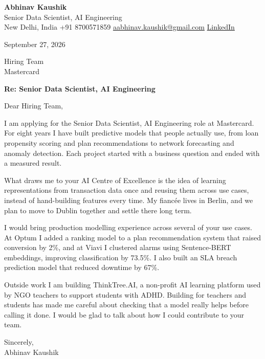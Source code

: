 \documentclass[11pt,a4paper]{article}
\begin{document}
{\Large\bfseries Abhinav Kaushik}\\
Senior Data Scientist, AI Engineering\\
New Delhi, India \textbar{} +91 8700571859 \textbar{} \href{mailto:aabhinav.kaushik@gmail.com}{aabhinav.kaushik@gmail.com} \textbar{} \href{https://www.linkedin.com/in/abhinav-kaushik10/}{LinkedIn}  

September 27, 2026

Hiring Team\\
Mastercard

\textbf{Re: Senior Data Scientist, AI Engineering}

Dear Hiring Team,

I am applying for the Senior Data Scientist, AI Engineering role at Mastercard. For eight years I have built predictive models that people actually use, from loan propensity scoring and plan recommendations to network forecasting and anomaly detection. Each project started with a business question and ended with a measured result.

What draws me to your AI Centre of Excellence is the idea of learning representations from transaction data once and reusing them across use cases, instead of hand-building features every time. My fiancée lives in Berlin, and we plan to move to Dublin together and settle there long term.

I would bring production modelling experience across several of your use cases. At Optum I added a ranking model to a plan recommendation system that raised conversion by 2\%, and at Viavi I clustered alarms using Sentence-BERT embeddings, improving classification by 73.5\%. I also built an SLA breach prediction model that reduced downtime by 67\%.

Outside work I am building ThinkTree.AI, a non-profit AI learning platform used by NGO teachers to support students with ADHD. Building for teachers and students has made me careful about checking that a model really helps before calling it done. I would be glad to talk about how I could contribute to your team.

Sincerely,\\[4pt]
Abhinav Kaushik
\end{document}
